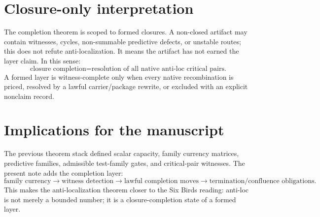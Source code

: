 \documentclass[11pt]{article}
\begin{document}
\section{Closure-only interpretation}

The completion theorem is scoped to formed closures.  A non-closed artifact may contain witnesses, cycles, non-summable predictive defects, or unstable routes; this does not refute anti-localization.  It means the artifact has not earned the layer claim.  In this sense:
\[
\text{closure completion} = \text{resolution of all native anti-loc critical pairs.}
\]
A formed layer is witness-complete only when every native recombination is priced, resolved by a lawful carrier/package rewrite, or excluded with an explicit nonclaim record.

\section{Implications for the manuscript}

The previous theorem stack defined scalar capacity, family currency matrices, predictive families, admissible test-family gates, and critical-pair witnesses.  The present note adds the completion layer:
\[
\text{family currency}
\to
\text{witness detection}
\to
\text{lawful completion moves}
\to
\text{termination/confluence obligations}.
\]
This makes the anti-localization theorem closer to the Six Birds reading: anti-loc is not merely a bounded number; it is a closure-completion state of a formed layer.
\end{document}
